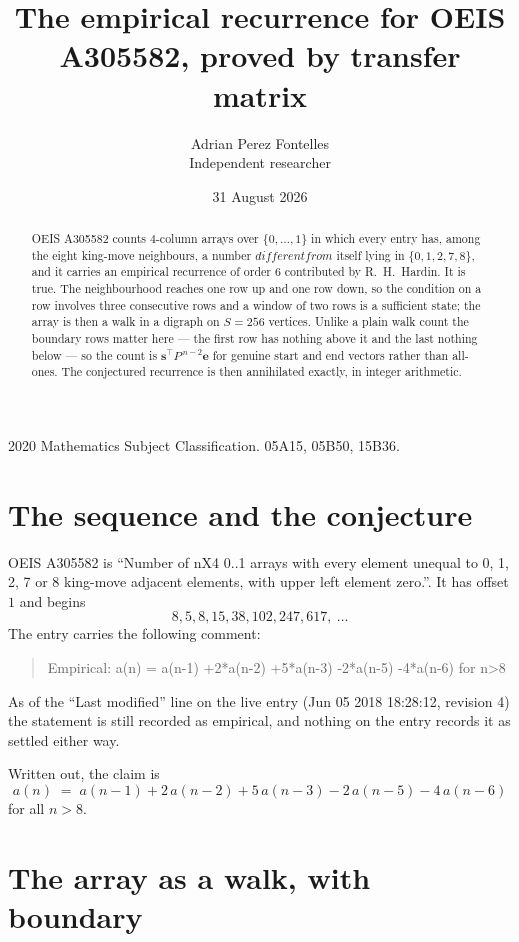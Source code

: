 \documentclass[11pt,a4paper]{article}
\title{The empirical recurrence for OEIS A305582, proved by transfer matrix}
\author{Adrian Perez Fontelles\\ \small Independent researcher}
\date{31 August 2026}
\theoremstyle{plain}
\theoremstyle{definition}
\begin{document}
\maketitle

\begin{abstract}
OEIS A305582 counts $4$-column arrays over $\{0,\dots,1\}$ in which every entry has,
among the eight king-move neighbours, a number $different from$ itself lying in $\{0,1,2,7,8\}$, and it carries an empirical
recurrence of order $6$ contributed by R.~H.~Hardin. It is true. The neighbourhood
reaches one row up and one row down, so the condition on a row involves three consecutive
rows and a window of two rows is a sufficient state; the array is then a walk in a digraph
on $S=256$ vertices. Unlike a plain walk count the boundary rows matter here --- the first
row has nothing above it and the last nothing below --- so the count is
$\mathbf{s}^{\!\top}P^{\,n-2}\mathbf{e}$ for genuine start and end vectors rather than
all-ones. The conjectured recurrence is then annihilated exactly, in integer arithmetic.
\end{abstract}

\noindent\small 2020 Mathematics Subject Classification. 05A15, 05B50, 15B36.\normalsize

\section{The sequence and the conjecture}

OEIS A305582 is ``Number of nX4 0..1 arrays with every element unequal to 0, 1, 2, 7 or 8 king-move adjacent elements, with upper left element zero.''. It has offset
$1$ and begins
\[
8, 5, 8, 15, 38, 102, 247, 617,\ \dots
\]
The entry carries the following comment:
\begin{quote}\small
Empirical: a(n) = a(n-1) +2*a(n-2) +5*a(n-3) -2*a(n-5) -4*a(n-6) for n>8
\end{quote}
As of the ``Last modified'' line on the live entry (Jun 05 2018 18:28:12, revision
4) the statement is still recorded as empirical, and nothing on the entry
records it as settled either way.

Written out, the claim is
\begin{equation}\label{eq:conj}
a(n)\;=\;a(n-1) + 2\,a(n-2) + 5\,a(n-3) - 2\,a(n-5) - 4\,a(n-6)
\end{equation}
for all $n>8$.

\section{The array as a walk, with boundary}
\end{document}
